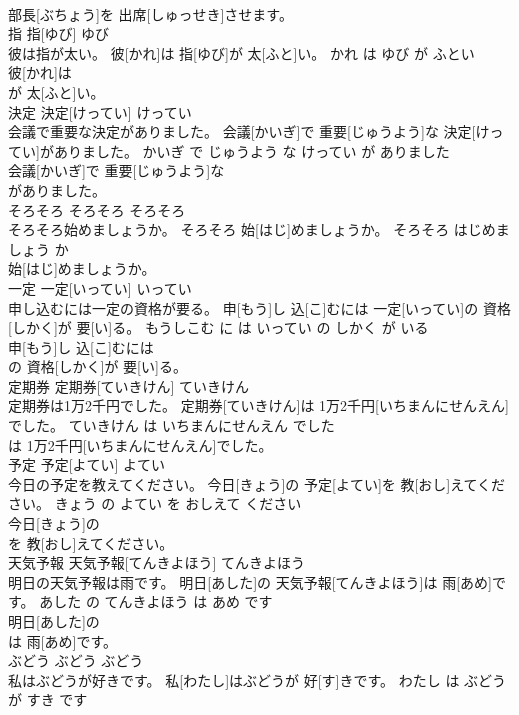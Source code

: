 \documentclass[8pt]{extreport}
\begin{document}
\begin{CJK}{UTF8}{min}
\\	部長[ぶちょう]を 出席[しゅっせき]させます。		
\\	指	指[ゆび]	ゆび	
\\	彼は指が太い。	彼[かれ]は 指[ゆび]が 太[ふと]い。	かれ は ゆび が ふとい	
\\	彼[かれ]は
\\	が 太[ふと]い。		
\\	決定	決定[けってい]	けってい	
\\	会議で重要な決定がありました。	会議[かいぎ]で 重要[じゅうよう]な 決定[けってい]がありました。	かいぎ で じゅうよう な けってい が ありました	
\\	会議[かいぎ]で 重要[じゅうよう]な
\\	がありました。		
\\	そろそろ	そろそろ	そろそろ	
\\	そろそろ始めましょうか。	そろそろ 始[はじ]めましょうか。	そろそろ はじめましょう か	
\\	始[はじ]めましょうか。		
\\	一定	一定[いってい]	いってい	
\\	申し込むには一定の資格が要る。	申[もう]し 込[こ]むには 一定[いってい]の 資格[しかく]が 要[い]る。	もうしこむ に は いってい の しかく が いる	
\\	申[もう]し 込[こ]むには
\\	の 資格[しかく]が 要[い]る。		
\\	定期券	定期券[ていきけん]	ていきけん	
\\	定期券は1万2千円でした。	定期券[ていきけん]は 1万2千円[いちまんにせんえん]でした。	ていきけん は いちまんにせんえん でした	
\\	は 1万2千円[いちまんにせんえん]でした。		
\\	予定	予定[よてい]	よてい	
\\	今日の予定を教えてください。	今日[きょう]の 予定[よてい]を 教[おし]えてください。	きょう の よてい を おしえて ください	
\\	今日[きょう]の
\\	を 教[おし]えてください。		
\\	天気予報	天気予報[てんきよほう]	てんきよほう	
\\	明日の天気予報は雨です。	明日[あした]の 天気予報[てんきよほう]は 雨[あめ]です。	あした の てんきよほう は あめ です	
\\	明日[あした]の
\\	は 雨[あめ]です。		
\\	ぶどう	ぶどう	ぶどう	
\\	私はぶどうが好きです。	私[わたし]はぶどうが 好[す]きです。	わたし は ぶどう が すき です	

\end{CJK}
\end{document}
